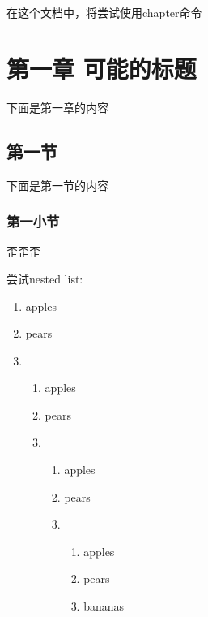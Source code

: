 \documentclass{report}
\begin{document}
在这个文档中，将尝试使用chapter命令
\chapter{第一章 可能的标题}
下面是第一章的内容
\section{第一节}
下面是第一节的内容
\subsection{第一小节}
歪歪歪

尝试nested list:
\begin{enumerate}
    \item apples
    \item pears
    \item \begin{enumerate}
        \item apples
        \item pears
        \item \begin{enumerate}
            \item apples
            \item pears
            \item \begin{enumerate}
                \item apples
                \item pears
                \item bananas
            \end{enumerate}
        \end{enumerate}
    \end{enumerate}
\end{enumerate}
\end{document}
